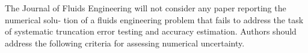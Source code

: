 \begin{frame}
The Journal of Fluids Engineering will not consider any paper reporting the numerical solu-
tion of a fluids engineering problem that fails to address the task of systematic truncation error
testing and accuracy estimation. Authors should address the following criteria for assessing
numerical uncertainty.
  
\end{frame}
